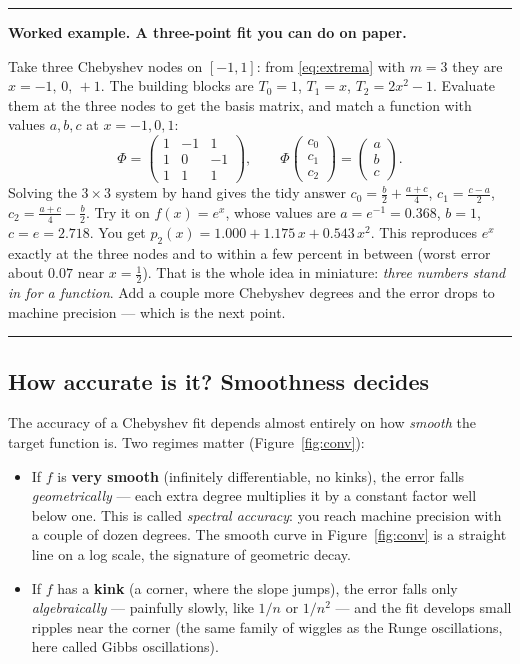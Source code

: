 \documentclass[11pt]{article}
\newcommand{\demohead}[1]{\par\smallskip\noindent%
  \textcolor{democ}{\rule{\linewidth}{0.7pt}}\par\nobreak\vspace{2pt}%
  \noindent\textbf{\textcolor{democ}{Worked example.} #1}\par\nobreak\vspace{2pt}}
\newcommand{\demofoot}{\par\vspace{2pt}\noindent%
  \textcolor{democ}{\rule{\linewidth}{0.7pt}}\par\smallskip}
\begin{document}
\demohead{A three-point fit you can do on paper.}
Take three Chebyshev nodes on $[-1,1]$: from \eqref{eq:extrema} with $m=3$
they are $x=-1,\,0,\,+1$. The building blocks are $T_0=1$, $T_1=x$,
$T_2=2x^2-1$. Evaluate them at the three nodes to get the basis matrix, and
match a function with values $a,b,c$ at $x=-1,0,1$:
\[
\Phi=\begin{pmatrix}1&-1&1\\ 1&0&-1\\ 1&1&1\end{pmatrix},
\qquad \Phi\begin{pmatrix}c_0\\ c_1\\ c_2\end{pmatrix}
=\begin{pmatrix}a\\ b\\ c\end{pmatrix}.
\]
Solving the $3\times3$ system by hand gives the tidy answer
$c_0=\tfrac{b}{2}+\tfrac{a+c}{4}$, $c_1=\tfrac{c-a}{2}$,
$c_2=\tfrac{a+c}{4}-\tfrac{b}{2}$.
Try it on $f(x)=e^{x}$, whose values are $a=e^{-1}=0.368$, $b=1$,
$c=e=2.718$. You get $p_2(x)=1.000+1.175\,x+0.543\,x^2$. This reproduces
$e^x$ exactly at the three nodes and to within a few percent in between
(worst error about $0.07$ near $x=\tfrac12$). That is the whole idea in
miniature: \emph{three numbers stand in for a function}. Add a couple more
Chebyshev degrees and the error drops to machine precision --- which is the
next point.
\demofoot

\subsection{How accurate is it? Smoothness decides}
\label{sec:accuracy}

The accuracy of a Chebyshev fit depends almost entirely on how \emph{smooth}
the target function is. Two regimes matter (Figure~\ref{fig:conv}):

\begin{itemize}
\item If $f$ is \textbf{very smooth} (infinitely differentiable, no kinks),
      the error falls \emph{geometrically} --- each extra degree multiplies
      it by a constant factor well below one. This is called \emph{spectral
      accuracy}: you reach machine precision with a couple of dozen degrees.
      The smooth curve in Figure~\ref{fig:conv} is a straight line on a log
      scale, the signature of geometric decay.
\item If $f$ has a \textbf{kink} (a corner, where the slope jumps), the
      error falls only \emph{algebraically} --- painfully slowly, like
      $1/n$ or $1/n^2$ --- and the fit develops small ripples near the
      corner (the same family of wiggles as the Runge oscillations, here
      called Gibbs oscillations).
\end{itemize}
\end{document}
